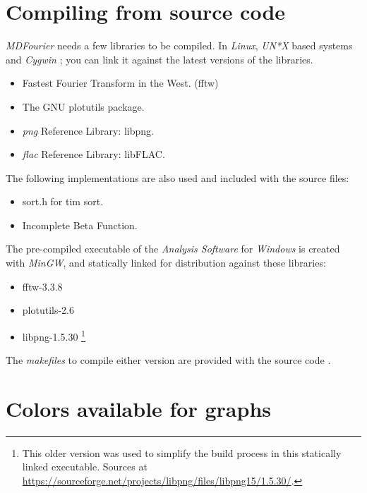 \documentclass[10pt,a4paper]{report}
\newcommand{\ac}[1]{\textit{\mbox{\acrshort{#1}}}}
\begin{document}
\begin{appendices}
\chapter{Compiling from source code}

\textit{MDFourier} needs a few libraries to be compiled. In \textit{Linux}, \textit{UN*X} based systems and \textit{Cygwin} \cite{cygwin}; you can link it against the latest versions of the libraries. 

\begin{itemize}
	\item Fastest Fourier Transform in the West. (fftw) \cite{fftw}
	\item The GNU plotutils package. \cite{libplot}
	\item \ac{png} Reference Library: libpng. \cite{libpng}
	\item \ac{flac} Reference Library: libFLAC. \cite{libflac}
\end{itemize}

The following implementations are also used and included with the source files:

\begin{itemize}
	\item sort.h for tim sort. \cite{sort}
	\item Incomplete Beta Function. \cite{betafunction}
\end{itemize}

The pre-compiled executable of the \textit{Analysis Software} for \textit{Windows} is created with \textit{MinGW}\cite{mingw}, and statically linked for distribution against these libraries:

\begin{itemize}
	\item fftw-3.3.8 \cite{fftw}
	\item plotutils-2.6 \cite{libplot}
	\item libpng-1.5.30 \footnote{This older version was used to simplify the build process in this statically linked executable. Sources at \url{https://sourceforge.net/projects/libpng/files/libpng15/1.5.30/}.}
\end{itemize}

The \textit{makefiles} to compile either version are provided with the source code \cite{sourcecode}.

\chapter{Colors available for graphs}
\label{availablecolors}


\end{appendices}
\end{document}
